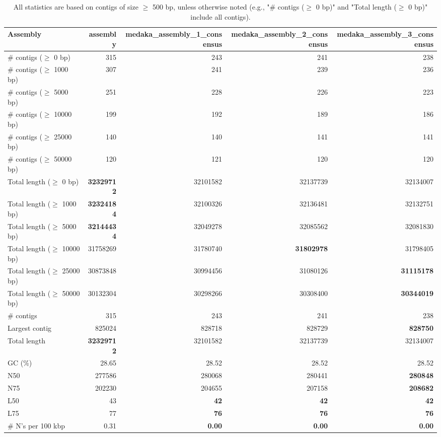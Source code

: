 \documentclass[12pt,a4paper]{article}
\begin{document}
\begin{table}[ht]
\begin{center}
\caption{All statistics are based on contigs of size $\geq$ 500 bp, unless otherwise noted (e.g., "\# contigs ($\geq$ 0 bp)" and "Total length ($\geq$ 0 bp)" include all contigs).}
\begin{tabular}{|l*{4}{|r}|}
\hline
Assembly & assembly & medaka\_assembly\_1\_consensus & medaka\_assembly\_2\_consensus & medaka\_assembly\_3\_consensus \\ \hline
\# contigs ($\geq$ 0 bp) & 315 & 243 & 241 & 238 \\ \hline
\# contigs ($\geq$ 1000 bp) & 307 & 241 & 239 & 236 \\ \hline
\# contigs ($\geq$ 5000 bp) & 251 & 228 & 226 & 223 \\ \hline
\# contigs ($\geq$ 10000 bp) & 199 & 192 & 189 & 186 \\ \hline
\# contigs ($\geq$ 25000 bp) & 140 & 140 & 141 & 141 \\ \hline
\# contigs ($\geq$ 50000 bp) & 120 & 121 & 120 & 120 \\ \hline
Total length ($\geq$ 0 bp) & {\bf 32329712} & 32101582 & 32137739 & 32134007 \\ \hline
Total length ($\geq$ 1000 bp) & {\bf 32324184} & 32100326 & 32136481 & 32132751 \\ \hline
Total length ($\geq$ 5000 bp) & {\bf 32144434} & 32049278 & 32085562 & 32081830 \\ \hline
Total length ($\geq$ 10000 bp) & 31758269 & 31780740 & {\bf 31802978} & 31798405 \\ \hline
Total length ($\geq$ 25000 bp) & 30873848 & 30994456 & 31080126 & {\bf 31115178} \\ \hline
Total length ($\geq$ 50000 bp) & 30132304 & 30298266 & 30308400 & {\bf 30344019} \\ \hline
\# contigs & 315 & 243 & 241 & 238 \\ \hline
Largest contig & 825024 & 828718 & 828729 & {\bf 828750} \\ \hline
Total length & {\bf 32329712} & 32101582 & 32137739 & 32134007 \\ \hline
GC (\%) & 28.65 & 28.52 & 28.52 & 28.52 \\ \hline
N50 & 277586 & 280068 & 280441 & {\bf 280848} \\ \hline
N75 & 202230 & 204655 & 207158 & {\bf 208682} \\ \hline
L50 & 43 & {\bf 42} & {\bf 42} & {\bf 42} \\ \hline
L75 & 77 & {\bf 76} & {\bf 76} & {\bf 76} \\ \hline
\# N's per 100 kbp & 0.31 & {\bf 0.00} & {\bf 0.00} & {\bf 0.00} \\ \hline
\end{tabular}
\end{center}
\end{table}
\end{document}
